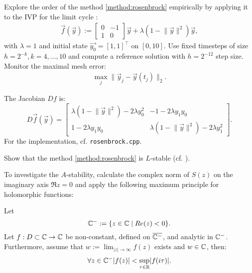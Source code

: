 \begin{problem}
\begin{subproblem}[3]
 Explore the order of the method \eqref{method:rosenbrock} empirically by applying it to the IVP for the limit cycle :
 \begin{align}
  \vec{f}(\vec{y}) := \begin{bmatrix}
                       0 & -1 \\ 1 & 0
                      \end{bmatrix} \vec{y} + \lambda ( 1 - \lVert \vec{y} \rVert^2 ) \vec{y},
 \end{align}
 with $\lambda = 1$ and initial state $\vec{y_0} = [1,1]^\top$ on $[0,10]$. Use fixed timesteps of size $h = 2^{-k}, k = 4,\dots,10$ and compute a reference solution with $h = 2^{-12}$ step size. Monitor the maximal mesh error:
 \begin{align*}
  \max_j \lVert  \vec{y}_j - \vec{y}(t_j) \rVert_2.
 \end{align*}
 \cprotEnv \begin{solution}
  The Jacobian $Df$ is:
  \[
  D\vec{f}(\vec{y}) = \begin{bmatrix}
                       \lambda ( 1 - \lVert \vec{y} \rVert^2 ) - 2 \lambda y_0^2 & -1 -2 \lambda y_1 y_0 \\
                       1 -2 \lambda y_1 y_0 & \lambda ( 1 - \lVert \vec{y} \rVert^2 ) - 2 \lambda y_1^2
                      \end{bmatrix}.
  \]
  For the implementation, cf. \verb|rosenbrock.cpp|.
 \end{solution}
\end{subproblem}

\begin{subproblem}[4]
 Show that the method \eqref{method:rosenbrock} is $L$-stable (cf. ).
 \begin{hint}
To investigate the $A$-stability, calculate the complex norm of $S(z)$ on the imaginary axis $\Re{z}=0$ and apply the following maximum principle for holomorphic functions:

\begin{theorem}
 Let \[\mathbb{C}^- := \{ z \in \mathbb{C} \; | \; Re(z) < 0 \}.\] Let $f: D \subset \mathbb{C} \rightarrow \mathbb{C}$ be non-constant, defined on $\overline{\mathbb{C}^-}$, and analytic in $\mathbb{C}^-$. Furthermore, assume that $w := \lim_{ \lvert z \rvert \rightarrow \infty} f(z)$ exists and $w \in \mathbb{C}$, then:
 \begin{align*}
  \forall z \in \mathbb{C}^- \lvert f(z) \rvert < \sup_{\tau \in \mathbb{R}} \lvert f(i \tau) \rvert.
 \end{align*}
\end{theorem}
 \end{hint}


\end{subproblem}
\end{problem}
